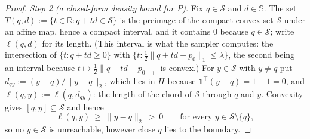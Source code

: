 \documentclass[11pt]{article}
\theoremstyle{plain}
\theoremstyle{definition}
\theoremstyle{remark}
\newcommand{\R}{\mathbb{R}}
\newcommand{\cS}{\mathcal{S}}
\begin{document}
\begin{proof}
\emph{Step 2 (a closed-form density bound for $P$).} Fix $q\in\cS$ and $d\in\mathbb S$.
The set $T(q,d):=\{t\in\R:q+td\in\cS\}$ is the preimage of the compact convex set $\cS$
under an affine map, hence a compact interval, and it contains $0$ because $q\in\cS$;
write $\ell(q,d)$ for its length. (This interval is what the sampler computes: the
intersection of $\{t:q+td\ge0\}$ with $\{t:\tfrac12\|q+td-p_0\|_1\le\lambda\}$, the
second being an interval because $t\mapsto\tfrac12\|q+td-p_0\|_1$ is convex.) For
$y\in\cS$ with $y\ne q$ put $d_{qy}:=(y-q)/\|y-q\|_2$, which lies in $H$ because
$\mathbf1^\top(y-q)=1-1=0$, and $\ell(q,y):=\ell(q,d_{qy})$: the length of the chord of
$\cS$ through $q$ and $y$. Convexity gives $[q,y]\subseteq\cS$ and hence
\begin{equation}\label{eq:chord-lower}
    \ell(q,y)\ \ge\ \|y-q\|_2\ >\ 0 \qquad\text{for every }y\in\cS\setminus\{q\},
\end{equation}
so no $y\in\cS$ is unreachable, however close $q$ lies to the boundary.


\end{proof}
\end{document}
